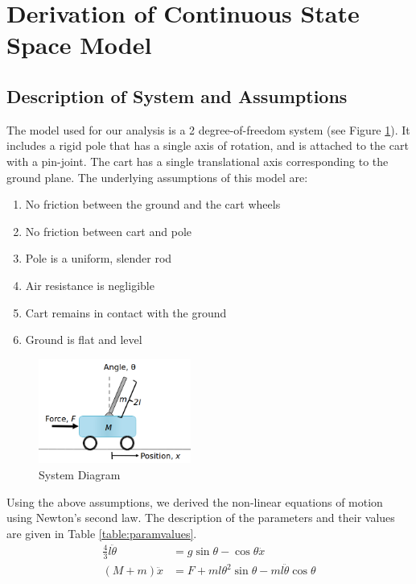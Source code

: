 \documentclass{article}
\begin{document}
\section{Derivation of Continuous State Space Model}
\subsection{Description of System and Assumptions}
The model used for our analysis is a 2 degree-of-freedom system (see Figure \ref{fig:sys_diagram}). It includes a rigid pole that has a single axis of rotation, and is attached to the cart with a pin-joint. The cart has a single translational axis corresponding to the ground plane. The underlying assumptions of this model are:

\begin{enumerate}
\item No friction between the ground and the cart wheels
\item No friction between cart and pole
\item Pole is a uniform, slender rod
\item Air resistance is negligible
\item Cart remains in contact with the ground
\item Ground is flat and level
\end{enumerate}
\begin{figure}[h!]
 	\centering
 	\includegraphics[width=5cm,keepaspectratio]{SystemDiagram.png}
 	\caption{System Diagram}
 	\label{fig:sys_diagram}
 \end{figure}
Using the above assumptions, we derived the non-linear equations of motion using Newton's second law.  The description of the parameters and their values are given in Table \ref{table:paramvalues}.
\begin{equation}
\begin{aligned}
\frac{4}{3}l \ddot{\theta} &= g \sin \theta - \cos \theta \ddot{x} \\
(M+m)\ddot{x} &= F + ml \theta^2 \sin\theta -ml\ddot{\theta}\cos\theta
\end{aligned}
\label{eq:EOM_nonlinear}
\end{equation}
\end{document}
